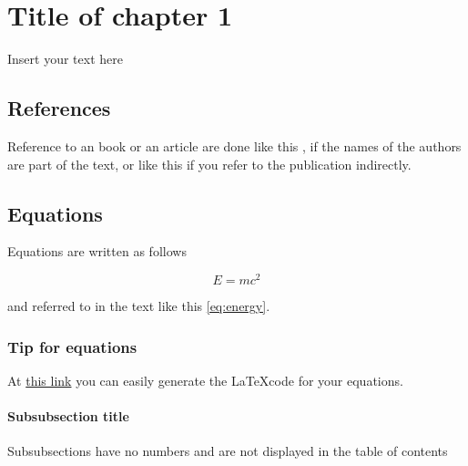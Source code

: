 \chapter{Title of chapter 1}

Insert your text here

\section{References}

Reference to an book or an article are done like this \citet{einstein1954ideas}, if the names of the authors are part of the text, or like this \citep{einstein1935can} if you refer to the publication indirectly.

\section{Equations}

Equations are written as follows

\begin{equation}
    E=mc^2
    \label{eq:energy}
\end{equation}

and referred to in the text like this \ref{eq:energy}.

\subsection{Tip for equations}

At \href{http://www.codecogs.com/latex/eqneditor.php}{this link} you can easily generate the \LaTeX code for your equations.

\subsubsection{Subsubsection title}

Subsubsections have no numbers and are not displayed in the table of contents
